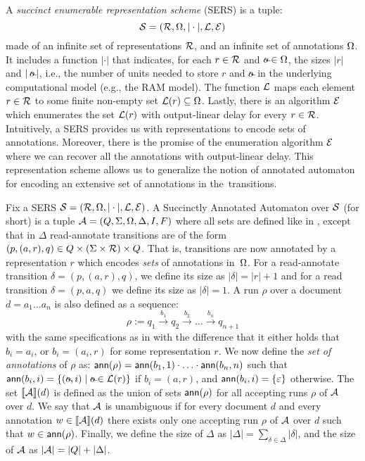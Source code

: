 A {\it succinct enumerable representation scheme} (SERS) is a tuple: 
$$
\mathcal{S} = (\mathcal{R}, \Omega, |\cdot|, \mathcal{L}, \mathcal{E})$$ 
made of an infinite set of representations $\mathcal{R}$, and an infinite set of annotations $\Omega$. 
It includes a function $|\cdot|$ that indicates, for each $r\in\mathcal{R}$ and $\oout\in\infAlph$, the sizes $|r|$ and $|\oout|$, i.e., the number of units needed to store $r$ and $\oout$ in the underlying computational model (e.g., the RAM model).
The function $\mathcal{L}$ maps each element $r\in\mathcal{R}$ to some finite non-empty set $\mathcal{L}(r)\subseteq\Omega$. 
Lastly, there is an algorithm $\mathcal{E}$ which enumerates the set $\mathcal{L}(r)$ with output-linear delay for every $r\in \mathcal{R}$. 
Intuitively, a SERS provides us with representations to encode sets of annotations. Moreover, there is the promise of the enumeration algorithm $\mathcal{E}$ where we can recover all the annotations with output-linear delay. This representation scheme allows us to generalize the notion of annotated automaton for encoding an extensive set of annotations in the~transitions.

Fix a SERS $\mathcal{S} = (\mathcal{R}, \Omega, |\cdot|, \mathcal{L}, \mathcal{E})$. A Succinctly Annotated Automaton over $\mathcal{S}$ (\crt for short) is a tuple $\mathcal{A} = (Q, \Sigma, \Omega, \Delta, I, F)$ where all sets are defined like in \rt, except that in $\Delta$ read-annotate transitions are of the form $(p, (a, r), q)\in Q\times(\Sigma\times\mathcal{R})\times Q$. That is, transitions are now annotated by a representation $r$ which encodes \emph{sets} of annotations in~$\Omega$. For a read-annotate transition $\delta = (p, (a, r), q)$, we define its size as $|\delta| = |r| + 1$ and for a read transition $\delta = (p, a, q)$ we define its size as $|\delta| = 1$. 
A run $\rho$ over a document $d = a_1\ldots a_n$ is also defined as a sequence:
$$
\rho := q_1 \xrightarrow{b_1} q_2 \xrightarrow{b_2} \ldots \xrightarrow{b_n} q_{n+1}
$$ 
with the same specifications as in \rt with the difference that it either holds that $b_i = a_i$, 
or $b_i = (a_i, r)$ for some representation $r$. We now define the {\it set of annotations} of $\rho$ as: $\textsf{ann}(\rho) = \textsf{ann}(b_1, 1)\cdot\ldots\cdot\textsf{ann}(b_n, n)$ such that $\ann(b_i, i) = \{(\oout, i)\mid\oout\in\cL(r)\}$ if $b_i = (a, r)$, and $\textsf{ann}(b_i, i) = \{\varepsilon\}$ otherwise.
The set ${\llbracket{\mathcal{A}}\rrbracket}(d)$ is defined as the union of sets $\textsf{ann}(\rho)$ for all accepting runs $\rho$ of $\mathcal{A}$ over $d$. We say that $\mathcal{A}$ is unambiguous if for every document $d$ and every annotation $w\in{\llbracket{\mathcal{A}}\rrbracket}(d)$ there exists only one accepting run $\rho$ of $\mathcal{A}$ over $d$ such that $w\in\textsf{ann}(\rho)$. Finally, we define the size of $\Delta$ as $|\Delta| = \sum_{\delta \in \Delta} |\delta|$, and the size of $\mathcal{A}$ as $|\mathcal{A}| = |Q| + |\Delta|$. 


